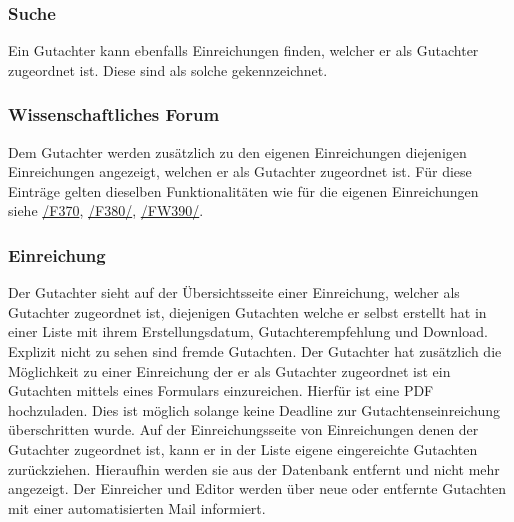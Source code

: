 \subsubsection{Suche}
\begin{description}
     Ein Gutachter kann ebenfalls Einreichungen finden, welcher er als Gutachter
    zugeordnet ist. Diese sind als solche gekennzeichnet.
\end{description}

\subsubsection{Wissenschaftliches Forum}
\begin{description}
     Dem Gutachter werden zusätzlich zu den eigenen Einreichungen diejenigen Einreichungen angezeigt,
    welchen er als Gutachter zugeordnet ist. Für diese Einträge gelten dieselben Funktionalitäten wie für die
    eigenen Einreichungen siehe \hyperref[funkt:370]{/F370}, \hyperref[funkt:380]{/F380/}, \hyperref[funkt:390]{/FW390/}.
\end{description}

\subsubsection{Einreichung}
\begin{description}
     Der Gutachter sieht auf der Übersichtsseite einer Einreichung, welcher als Gutachter
    zugeordnet ist, diejenigen Gutachten welche er selbst erstellt hat in einer
    Liste mit ihrem Erstellungsdatum, Gutachterempfehlung und Download. Explizit nicht zu sehen sind fremde Gutachten.
     Der Gutachter hat zusätzlich die Möglichkeit zu einer Einreichung der er als Gutachter zugeordnet ist
    ein Gutachten mittels eines Formulars einzureichen. Hierfür ist eine PDF hochzuladen. Dies ist möglich solange keine
    Deadline zur Gutachtenseinreichung überschritten wurde.
     Auf der Einreichungsseite von Einreichungen denen der Gutachter zugeordnet ist,
    kann er in der Liste eigene eingereichte Gutachten zurückziehen. Hieraufhin werden sie aus
    der Datenbank entfernt und nicht mehr angezeigt.
     Der Einreicher und Editor werden über neue oder entfernte Gutachten mit einer automatisierten
    Mail informiert.
\end{description}

